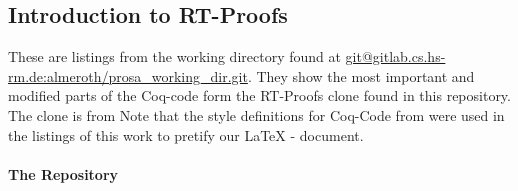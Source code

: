 

\subsection{Introduction to RT-Proofs}


These are listings from the working directory found at \url{git@gitlab.cs.hs-rm.de:almeroth/prosa_working_dir.git}.
They show the most important and modified parts of the Coq-code form the RT-Proofs clone found in this repository. The clone is from %
Note that the style definitions for Coq-Code from  \cite{CoqStyleListing} were used in the listings of this work to pretify our {\LaTeX} - document.




\paragraph{The Repository}


